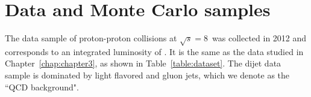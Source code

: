 \newpage
%



\section{Data and Monte Carlo samples}
\label{sec:data_and_mc_samples}


The data sample of proton-proton collisions at $\sqrt{s}=8$~\TeVcc was collected in 2012 and corresponds to
an integrated luminosity of \intlumi. It is the same as the data studied in 
Chapter~\ref{chap:chapter3}, as shown in Table~\ref{table:dataset}. 
The dijet data sample is dominated by light flavored and gluon jets, which we denote as 
the ``QCD background".  

